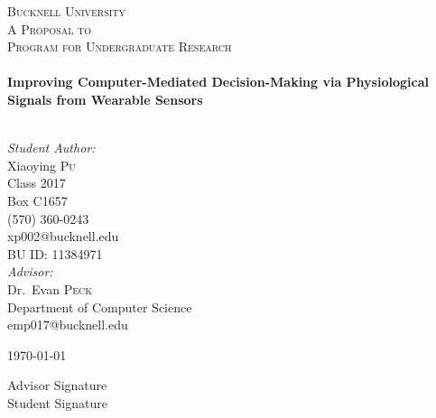 \begin{titlepage}
\begin{center}


\textsc{\LARGE Bucknell University}\\[1.5cm]
\textsc{\large A Proposal to}\\[0.5cm]
\textsc{\Large  Program for Undergraduate Research}\\[0.5cm]

\HRule \\[0.4cm]
{ \huge \bfseries Improving Computer-Mediated Decision-Making via Physiological Signals from Wearable Sensors \\[0.4cm] }

\HRule \\[1.5cm]

\emph{Student Author:}\\
Xiaoying \textsc{Pu}\\
Class 2017\\
Box C1657\\
(570) 360-0243\\
xp002@bucknell.edu\\
BU ID: 11384971\\


\vspace{10pt}
\emph{Advisor:} \\
Dr.~Evan \textsc{Peck}\\
Department of Computer Science\\
emp017@bucknell.edu

\vfill

{\large \today}
\vspace{40pt}
\end{center}
{\large Advisor Signature \underline{\hspace{5cm}} \vspace{20pt} }\\
{\large Student Signature \underline{\hspace{5cm}}}

\end{titlepage}